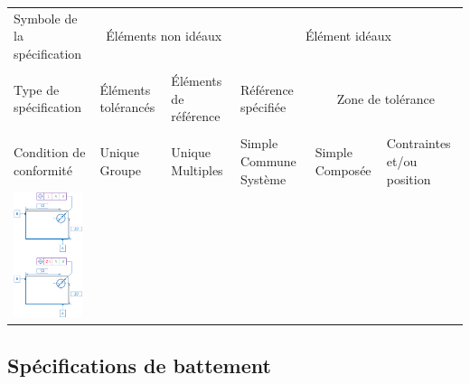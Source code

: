 \documentclass[11pt,oneside]{article}
\begin{document}
\begin{exemple}
\footnotesize{
\begin{center}
\begin{tabular}{|p{}|p{}|p{}|p{}|p{}|p{}|}
\hline
Symbole de la spécification & 
\multicolumn{2}{c|}{Éléments non idéaux} &
\multicolumn{3}{c|}{Élément idéaux} \\
&
\multicolumn{2}{c|}{} &
\multicolumn{3}{c|}{}\\
\hline
Type de spécification & 
Éléments tolérancés &
Éléments de référence & 
Référence spécifiée & 
\multicolumn{2}{c|}{Zone de tolérance} \\
&&&&
\multicolumn{2}{c|}{}\\
\hline
Condition de conformité & 
Unique Groupe & Unique Multiples &
Simple Commune Système &
Simple Composée & 
Contraintes et/ou position \\
\hline
\multirow{12}{*}{\includegraphics[width=2cm]{png/ex_loca}}&&&&&\\
&&&&&\\
&&&&&\\
&&&&&\\
&&&&&\\
&&&&&\\
&&&&&\\
&&&&&\\
&&&&&\\
&&&&&\\
&&&&&\\
&&&&&\\
\hline
\end{tabular}
\end{center}
}
\end{exemple}



\subsection{Spécifications  de battement}
\end{document}
